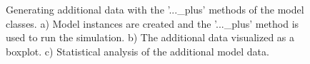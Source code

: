 \documentclass[a4paper,10pt]{article}
\begin{document}
\begin{figure}
\label{Fig:ModelPlusMethods}
\caption{Generating additional data with the '...\_plus' methods of the model classes. a) Model instances are created and the '...\_plus' method is used to run the simulation. b) The additional data visualized
as a boxplot. c) Statistical analysis of the additional model data.}
\end{figure}
\end{document}
